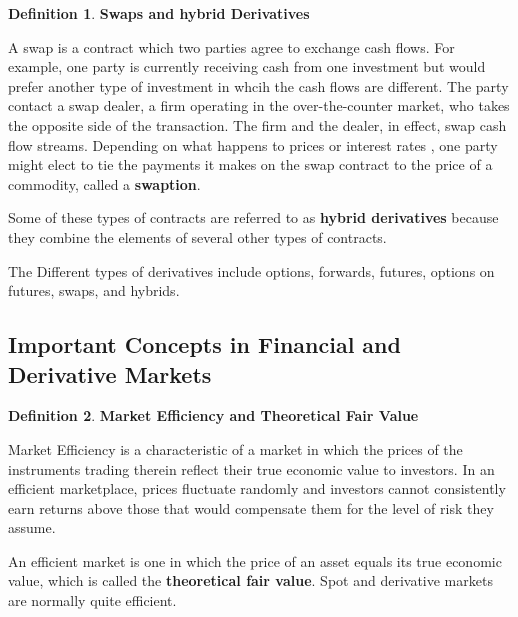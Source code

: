 \documentclass{book}
\theoremstyle{definition}
\newtheorem{definition}{Definition}[section]
\theoremstyle{remark}
\begin{document}
        \begin{definition}{\textbf{Swaps and hybrid Derivatives}}
            
            A swap is a contract which two parties agree to exchange cash flows. For example, one party is currently receiving cash from one investment but would prefer another type of investment in whcih the cash flows are different. The party contact a swap dealer, a firm operating in the over-the-counter market, who takes the opposite side of the transaction. The firm and the dealer, in effect, swap cash flow streams. Depending on what happens to prices or interest rates , one party might elect to tie the payments it makes on the swap contract to the price of a commodity, called a \textbf{swaption}.
            
            Some of these types of contracts are referred to as \textbf{hybrid derivatives} because they combine the elements of several other types of contracts. 
        \end{definition}
        
        \begin{tcolorbox}[colback=blue!5!white,colframe=blue!75!black, title=Sticky Note]
            The Different types of derivatives include options, forwards, futures, options on futures, swaps, and hybrids.
        \end{tcolorbox}
    
    \newpage 
    \subsection{Important Concepts in Financial and Derivative Markets}
        
        \begin{definition}{\textbf{Market Efficiency and Theoretical Fair Value}}
            
            Market Efficiency is a characteristic of a market in which the prices of the instruments trading therein reflect their true economic value to investors. In an efficient marketplace, prices fluctuate randomly and investors cannot consistently earn returns above those that would compensate them for the level of risk they assume.
            
            An efficient market is one in which the price of an asset equals its true economic value, which is called the \textbf{theoretical fair value}. Spot and derivative markets are normally quite efficient. 
        \end{definition}
        
\end{document}
